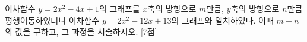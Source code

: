 이차함수 $y=2x^2-4x+1$의 그래프를 $x$축의 방향으로 $m$만큼, $y$축의 방향으로 $n$만큼 평행이동하였더니 이차함수 $y=2x^2-12x+13$의 그래프와 일치하였다. 이때 $m+n$의 값을 구하고, 그 과정을 서술하시오. \mbox{[7점]}
